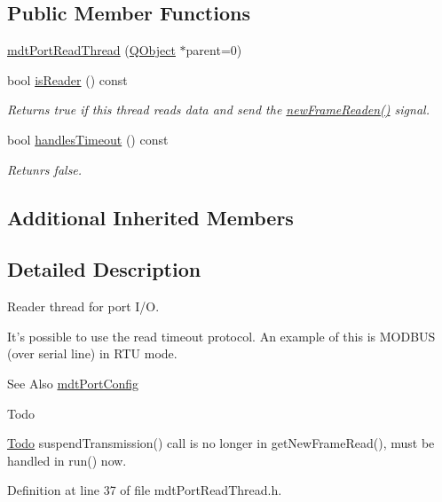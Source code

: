 \subsection*{Public Member Functions}
\begin{DoxyCompactItemize}
\item 
\hyperlink{classmdt_port_read_thread_a180074c2ff60f5103d7e3aa27c1cdb01}{mdt\-Port\-Read\-Thread} (\hyperlink{class_q_object}{Q\-Object} $\ast$parent=0)
\item 
bool \hyperlink{classmdt_port_read_thread_a0138d613b61056c9f8373331de2d9a84}{is\-Reader} () const 
\begin{DoxyCompactList}\small\item\em Returns true if this thread reads data and send the \hyperlink{classmdt_port_thread_a7fc2245c753fd65e1beffec211c41461}{new\-Frame\-Readen()} signal. \end{DoxyCompactList}\item 
bool \hyperlink{classmdt_port_read_thread_afa42f86f3fed878b8f44cacb3a2f41af}{handles\-Timeout} () const 
\begin{DoxyCompactList}\small\item\em Retunrs false. \end{DoxyCompactList}\end{DoxyCompactItemize}
\subsection*{Additional Inherited Members}


\subsection{Detailed Description}
Reader thread for port I/\-O. 

It's possible to use the read timeout protocol. An example of this is M\-O\-D\-B\-U\-S (over serial line) in R\-T\-U mode.

\begin{DoxySeeAlso}{See Also}
\hyperlink{classmdt_port_config}{mdt\-Port\-Config}
\end{DoxySeeAlso}
\begin{DoxyRefDesc}{Todo}
\item[\hyperlink{todo__todo000026}{Todo}]suspend\-Transmission() call is no longer in get\-New\-Frame\-Read(), must be handled in run() now. \end{DoxyRefDesc}


Definition at line 37 of file mdt\-Port\-Read\-Thread.\-h.




